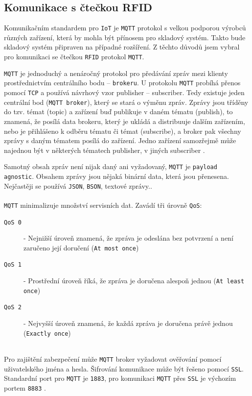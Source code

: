 \documentclass[czech,BP]{thesiskiv}
\begin{document}
		\subsection{Komunikace s čtečkou RFID}
			Komunikačním standardem pro \texttt{IoT} je \texttt{MQTT} protokol s velkou podporou výrobců různých zařízení, která by mohla být přínosem pro skladový systém. Takto bude skladový systém připraven na případné rozšíření.
			Z těchto důvodů jsem vybral pro komunikaci se čtečkou \texttt{RFID} protokol \texttt{MQTT}.
	
			 
			
			\texttt{MQTT} je jednoduchý a nenáročný protokol pro předávání zpráv mezi klienty prostřednictvím centrálního bodu – \texttt{brokeru}. U protokolu \texttt{MQTT} probíhá přenos pomocí \texttt{TCP} a používá návrhový vzor publisher – subscriber. Tedy existuje jeden centrální bod (\texttt{MQTT broker}), který se stará o výměnu zpráv. Zprávy jsou tříděny do tzv. témat (topic) a zařízení buď publikuje v daném tématu (publish), to znamená, že posílá data brokeru, který je ukládá a distribuuje dalším zařízením, nebo je přihlášeno k odběru tématu či témat (subscribe), a broker pak všechny zprávy s daným tématem posílá do zařízení. Jedno zařízení samozřejmě může najednou být v některých tématech publisher, v jiných subscriber \cite{maly2016mqtt}.

Samotný obsah zpráv není nijak daný ani vyžadovaný, \texttt{MQTT} je \texttt{payload agnostic}. Obsahem zprávy jsou nějaká binární data, která jsou přenesena. Nejčastěji se používá \texttt{JSON}, \texttt{BSON}, textové zprávy.\cite{maly2016mqtt}.
\\\\  
\texttt{MQTT} minimalizuje množství servisních dat. Zavádí tři úrovně \texttt{QoS}:
\begin{description}
\item [\texttt{QoS 0}] - Nejnižší úroveň znamená, že zpráva je odeslána bez potvrzení a není zaručeno její doručení (\texttt{At most once})
\item [\texttt{QoS 1}] - Prostřední úroveň říká, že zpráva je doručena alespoň jednou (\texttt{At least once})
\item [\texttt{QoS 2}] - Nejvyšší úroveň znamená, že každá zpráva je doručena právě jednou (\texttt{Exactly once})
\end{description}
\ \\
Pro zajištění zabezpečení může \texttt{MQTT} broker vyžadovat ověřování pomocí uživatelského jména a hesla. Šifrování komunikace může být řešeno pomocí \texttt{SSL}. 
Standardní port pro \texttt{MQTT} je \texttt{1883}, pro komunikaci \texttt{MQTT} přes \texttt{SSL} je výchozím portem \texttt{8883} \cite{karagiannis2015survey}.
			
\end{document}
